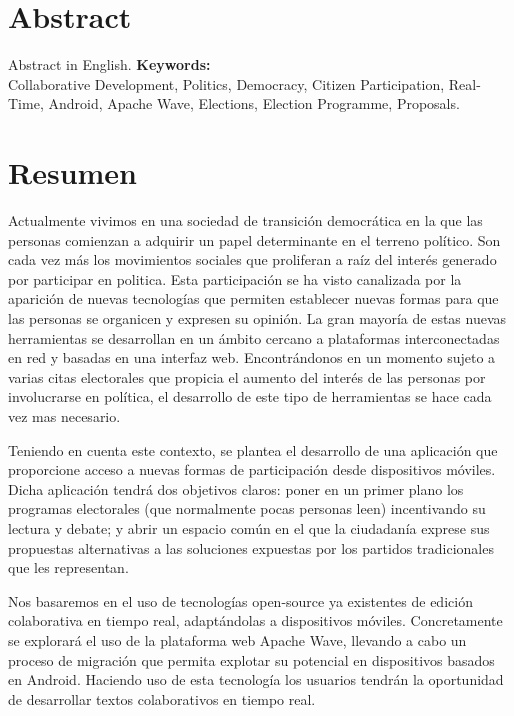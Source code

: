 \newpage
\renewcommand{\thepage}{\Roman{page}}
\setcounter{page}{9}
\chapter*{Abstract}
Abstract in English.
\vfill
{\large \bf Keywords:}\\
{\large Collaborative Development, Politics, Democracy, Citizen Participation, Real-Time, Android, Apache Wave, Elections, Election Programme, Proposals. }

\newpage
\renewcommand{\thepage}{\Roman{page}}
\setcounter{page}{10}
\chapter*{Resumen}
Actualmente vivimos en una sociedad de transición democrática en la que las personas comienzan a adquirir un papel determinante en el terreno político. Son cada vez más los movimientos sociales que proliferan a raíz del interés generado por participar en politica. Esta participación se ha visto canalizada por la aparición de nuevas tecnologías que permiten establecer nuevas formas para que las personas se organicen y expresen su opinión. La gran mayoría de estas nuevas herramientas se desarrollan en un ámbito cercano a plataformas interconectadas en red y basadas en una interfaz web. Encontrándonos en un momento sujeto a varias citas electorales que propicia el aumento del interés de las personas por involucrarse en política, el desarrollo de este tipo de herramientas se hace cada vez mas necesario.

Teniendo en cuenta este contexto, se plantea el desarrollo de una aplicación que proporcione acceso a nuevas formas de participación desde dispositivos móviles. Dicha aplicación tendrá dos objetivos claros: poner en un primer plano los programas electorales (que normalmente pocas personas leen) incentivando su lectura y debate; y abrir un espacio común en el que la ciudadanía exprese sus propuestas alternativas a las soluciones expuestas por los partidos tradicionales que les representan.

Nos basaremos en el uso de tecnologías open-source ya existentes de edición colaborativa en tiempo real, adaptándolas a dispositivos móviles. Concretamente se explorará el uso de la plataforma web Apache Wave, llevando a cabo un proceso de migración que permita explotar su potencial en dispositivos basados en Android. Haciendo uso de esta tecnología los usuarios tendrán la oportunidad de desarrollar textos colaborativos en tiempo real.

